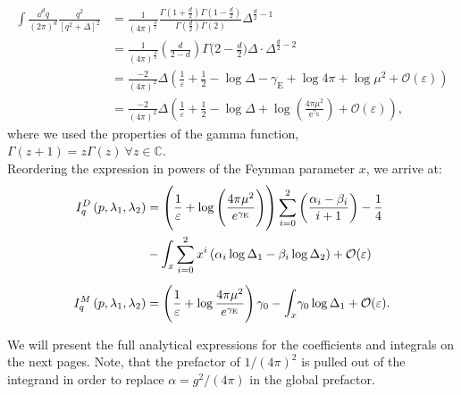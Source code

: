 \begin{equation}
\begin{aligned}
	\int \frac{\dd^d q}{(2\pi)^d} \frac{q^2}{\left[q^2 + \Delta\right]^2} &=  \frac{1}{(4\pi)^{\frac{d}{2}}} \frac{\Gamma(1+\frac{d}{2})\Gamma(1-\frac{d}{2})}{\Gamma(\frac{d}{2})\Gamma(2)} \Delta^{\frac{d}{2}-1} \\
	&= \frac{1}{(4\pi)^{\frac{d}{2}}}\left(\frac{d}{2-d}\right)\Gamma\big(2-\frac{d}{2}\big) \Delta\cdot\Delta^{\frac{d}{2}-2} \\
	&= \frac{-2}{(4\pi)^{2}}\Delta\left(\frac{1}{\varepsilon} +\frac{1}{2}- \operatorname{log}\Delta - \gamma_{\mathrm{E}} + \operatorname{log} 4\pi + \operatorname{log} \mu^2 + \mathcal{O}(\varepsilon)\right)\\
	&= \frac{-2}{(4\pi)^{2}}\Delta\left(\frac{1}{\varepsilon} +\frac{1}{2} - \operatorname{log}\Delta + \operatorname{log}\left(\frac{4\pi\mu^2}{\operatorname{e}^{\gamma_{\mathrm{E}}}}\right)   + \mathcal{O}(\varepsilon)\right),
	\end{aligned}
\end{equation}
where we used the properties of the gamma function, $\Gamma(z+1)=z\Gamma(z)\ \forall z\in \mathbb{C}$.\\

Reordering the expression in powers of the Feynman parameter $x$, we arrive at:
\begin{align}
I_q^D\left(p, \lambda_1, \lambda_2\right) &=\left(\frac{1}{\varepsilon}+\log \left(\frac{4 \pi \mu^{2}}{e^{\gamma_{\mathrm{E}}}}\right)\right) \sum\limits_{i=0}^{2}\left( \frac{\alpha_{i}-\beta_{i}}{i+1}\right) - \frac{1}{4}\nonumber\\
&-\mathlarger{\int}_{x} \sum\limits_{i=0}^{2} x^{i}\left(\alpha_{i} \log \Delta_{1}-\beta_{i} \log \Delta_{2}\right)   + \mathcal{O}(\varepsilon) \label{eqn:IqD}\\[0.5em]
I_q^M\left(p, \lambda_1, \lambda_2\right)&=\left(\frac{1}{\varepsilon}+\log \frac{4 \pi \mu^{2}}{e^{\gamma_{\mathrm{E}}}}\right) \gamma_0
-\mathlarger{\int}_{x} \gamma_{0} \log \Delta_{1} +\mathcal{O}(\varepsilon).\label{eqn:IqM}
\end{align}


We will present the full analytical expressions for the coefficients and integrals on the next pages. Note, that the prefactor of $1/(4\pi)^2$ is pulled out of the integrand in order to replace $\alpha = g^2/(4\pi)$ in the global prefactor.


